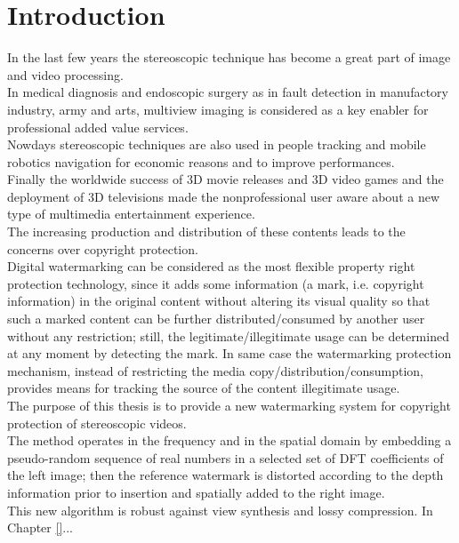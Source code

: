 \chapter*{Introduction}
\label{intro}
{}

In the last few years the stereoscopic technique has become a great part of image and video processing.\\
In medical diagnosis and endoscopic surgery \cite{MED}\cite{MED2} as in fault detection in manufactory industry, army and arts,
multiview imaging is considered as a key enabler  for professional added value services.\\
Nowdays stereoscopic techniques are also used in people tracking \cite{TRACK} and mobile robotics
navigation \cite{PG} for economic reasons and to improve performances.\\
Finally the worldwide success of 3D movie releases and 3D video games \cite{GAME} and the deployment of 3D televisions made the nonprofessional user aware about a new type of multimedia entertainment experience.\\
The increasing production and distribution of these contents leads to the concerns over copyright protection.\\
Digital watermarking can be considered as the most flexible property right protection technology, since it adds some information (a mark, i.e. copyright information) in the
original content without altering its visual quality so that such a marked content can be further distributed/consumed by another user without any restriction; still, the legitimate/illegitimate usage can be determined at any moment by detecting the mark. In same case the watermarking protection mechanism, instead of restricting the media copy/distribution/consumption, provides means for tracking the source of the content illegitimate usage.\\
The purpose of this thesis is to provide a new watermarking system for copyright protection of stereoscopic videos.\\
The method operates in the frequency and in the spatial domain by embedding a pseudo-random sequence of real numbers in a selected set of DFT coefficients of the left image; then the reference watermark is distorted according to the depth information prior to insertion and spatially added to the right image.\\
This new algorithm is robust against view synthesis and lossy compression.
In Chapter \ref{}...